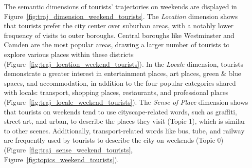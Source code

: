 \documentclass{article}
\theoremstyle{remark}
\begin{document}
The semantic dimensions of tourists' trajectories on weekends are displayed in Figure~\ref{fig:traj_dimension_weekend_tourists}. The \textit{Location} dimension shows that tourists prefer the city center over suburban areas, with a notably lower frequency of visits to outer boroughs. Central boroughs like Westminster and Camden are the most popular areas, drawing a larger number of tourists to explore various places within these districts (Figure~\ref{fig:traj_location_weekend_tourists}). In the \textit{Locale} dimension, tourists demonstrate a greater interest in entertainment places, art places, green \& blue spaces, and accommodation, in addition to the four popular categories shared with locals: transport, shopping places, restaurants, and professional places (Figure~\ref{fig:traj_locale_weekend_tourists}). The \textit{Sense of Place} dimension shows that tourists on weekends tend to use cityscape-related words, such as graffiti, street art, and urban, to describe the places they visit (Topic 1), which is similar to other scenes. Additionally, transport-related words like bus, tube, and railway are frequently used by tourists to describe the city on weekends (Topic 0) (Figure~\ref{fig:traj_sense_weekend_tourists}, Figure~\ref{fig:topics_weekend_tourists}).
\end{document}
